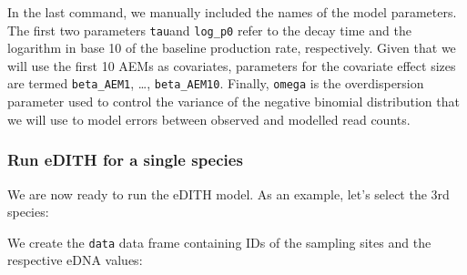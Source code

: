 \documentclass[
]{article}
\newenvironment{Shaded}{\begin{snugshade}}{\end{snugshade}}
\newcommand{\AttributeTok}[1]{\textcolor[rgb]{0.13,0.29,0.53}{#1}}
\newcommand{\CommentTok}[1]{\textcolor[rgb]{0.56,0.35,0.01}{\textit{#1}}}
\newcommand{\DecValTok}[1]{\textcolor[rgb]{0.00,0.00,0.81}{#1}}
\newcommand{\FunctionTok}[1]{\textcolor[rgb]{0.13,0.29,0.53}{\textbf{#1}}}
\newcommand{\NormalTok}[1]{#1}
\newcommand{\OtherTok}[1]{\textcolor[rgb]{0.56,0.35,0.01}{#1}}
\newcommand{\SpecialCharTok}[1]{\textcolor[rgb]{0.81,0.36,0.00}{\textbf{#1}}}
\begin{document}
In the last command, we manually included the names of the model parameters. The first two parameters \texttt{tau}and \texttt{log\_p0} refer to the decay time and the logarithm in base 10 of the baseline production rate, respectively. Given that we will use the first 10 AEMs as covariates, parameters for the covariate effect sizes are termed \texttt{beta\_AEM1}, \ldots, \texttt{beta\_AEM10}. Finally, \texttt{omega} is the overdispersion parameter used to control the variance of the negative binomial distribution that we will use to model errors between observed and modelled read counts.

\hypertarget{run-edith-for-a-single-species}{%
\subsubsection{Run eDITH for a single species}\label{run-edith-for-a-single-species}}

We are now ready to run the eDITH model. As an example, let's select the 3rd species:

\begin{Shaded}
\end{Shaded}

We create the \texttt{data} data frame containing IDs of the sampling sites and the respective eDNA values:

\begin{Shaded}
\end{Shaded}
\end{document}
